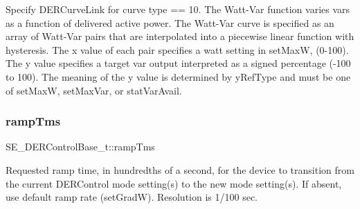 Specify D\+E\+R\+Curve\+Link for curve type == 10. The Watt-\/\+Var function varies vars as a function of delivered active power. The Watt-\/\+Var curve is specified as an array of Watt-\/\+Var pairs that are interpolated into a piecewise linear function with hysteresis. The x value of each pair specifies a watt setting in set\+MaxW, (0-\/100). The y value specifies a target var output interpreted as a signed percentage (-\/100 to 100). The meaning of the y value is determined by y\+Ref\+Type and must be one of set\+MaxW, set\+Max\+Var, or stat\+Var\+Avail. \mbox{\label{group__DERControlBase_ga69b8b3789a6a21ee8b6e718340dce614}} 
\subsubsection{\texorpdfstring{ramp\+Tms}{rampTms}}
{\footnotesize\ttfamily S\+E\+\_\+\+D\+E\+R\+Control\+Base\+\_\+t\+::ramp\+Tms}

Requested ramp time, in hundredths of a second, for the device to transition from the current D\+E\+R\+Control mode setting(s) to the new mode setting(s). If absent, use default ramp rate (set\+GradW). Resolution is 1/100 sec. 